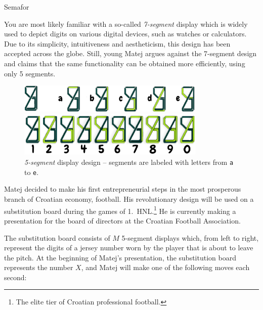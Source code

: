 \begin{statement}[
  problempoints=100,
  timelimit=4 seconds,
  memorylimit=512 MiB,
]{Semafor}

You are most likely familiar with a so-called \textit{7-segment} display which
is widely used to depict digits on various digital devices, such as watches or
calculators. Due to its simplicity, intuitiveness and aestheticism, this design
has been accepted across the globe. Still, young Matej argues against the
7-segment design and claims that the same functionality can be obtained
more efficiently, using only 5 segments.

\begin{figure}[H]
  \begin{center}
    \includegraphics[width=0.8\textwidth]{img/5segment.png}

    \vspace{0.5cm}

    \includegraphics[width=0.8\textwidth]{img/5segmentdigits.png}
    \caption*{\textit{5-segment} display design -- segments are labeled
              with letters from \texttt{a} to \texttt{e}.}
  \end{center}
\end{figure}
  \vspace{-0.7cm}
Matej decided to make his first entrepreneurial steps in the most prosperous
branch of Croatian economy, football. His revolutionary design will be used
on a substitution board during the games of 1.\ HNL.\footnote{The elite tier
of Croatian professional football.} He is currently making a presentation for
the board of directors at the Croatian Football Association.

The substitution board consists of $M$ 5-segment displays which, from left to
right, represent the digits of a jersey number worn by the player that is about
to leave the pitch. At the beginning of Matej's presentation, the substitution
board represents the number $X$, and Matej will make one of the following moves
each second:


\end{statement}
